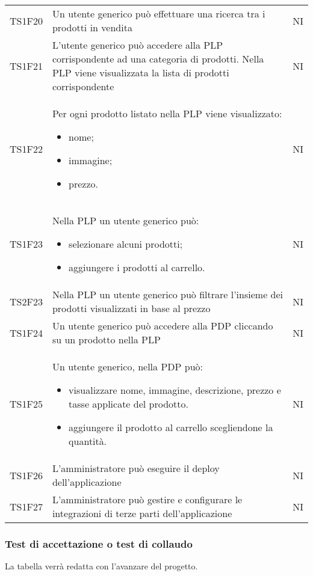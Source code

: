 {\begin{longtable}{C{3cm} C{10.2cm} C{1.5cm}}
TS1F20 & Un utente generico può effettuare una ricerca tra i prodotti in vendita & NI\\

TS1F21 & L'utente generico può accedere alla PLP corrispondente ad una categoria di prodotti. Nella PLP viene visualizzata la lista di prodotti corrispondente & NI\\

TS1F22 & Per ogni prodotto listato nella PLP viene visualizzato:
\begin{itemize}
	\item nome;
	\item immagine;
	\item prezzo.
\end{itemize} & NI\\

TS1F23 & Nella PLP un utente generico può:
\begin{itemize}
	\item selezionare alcuni prodotti;
	\item aggiungere i prodotti al carrello.
\end{itemize} & NI\\

TS2F23 & Nella PLP un utente generico può filtrare l'insieme dei prodotti visualizzati in base al prezzo & NI\\

TS1F24 & Un utente generico può accedere alla PDP cliccando su un prodotto nella PLP & NI\\

TS1F25 & Un utente generico, nella PDP può:
\begin{itemize}
	\item visualizzare nome, immagine, descrizione, prezzo e tasse applicate del prodotto.
	\item aggiungere il prodotto al carrello scegliendone la quantità.
\end{itemize} & NI\\

TS1F26 & L'amministratore può eseguire il deploy dell'applicazione & NI\\

TS1F27 & L'amministratore può gestire e configurare le integrazioni di terze parti dell'applicazione & NI\\



\end{longtable}


}
\subsubsection{Test di accettazione o test di collaudo}
La tabella verrà redatta con l'avanzare del progetto.